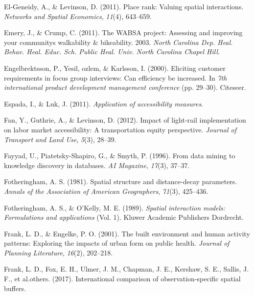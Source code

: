 \documentclass[12pt,twoside]{reedthesis}
\newlength{\cslhangindent}
\newenvironment{CSLReferences}[2] %
 {%
  \setlength{\parindent}{0pt}
  \ifodd #1 \everypar{\setlength{\hangindent}{\cslhangindent}}\ignorespaces\fi
  \ifnum #2 > 0
  \setlength{\parskip}{#2\baselineskip}
  \fi
 }%
 {}
\begin{document}
\begin{CSLReferences}{1}{0}
\leavevmode{}%
El-Geneidy, A., \& Levinson, D. (2011). Place rank: Valuing spatial interactions. \emph{Networks and Spatial Economics}, \emph{11}(4), 643--659.

\leavevmode{}%
Emery, J., \& Crump, C. (2011). The WABSA project: Assessing and improving your communitys walkability \& bikeability. 2003. \emph{North Carolina Dep. Heal. Behav. Heal. Educ. Sch. Public Heal. Univ. North Carolina Chapel Hill}.

\leavevmode{}%
Engelbrektsson, P., Yesil, ozlem, \& Karlsson, I. (2000). Eliciting customer requirements in focus group interviews: Can efficiency be increased. In \emph{7th international product development management conference} (pp. 29--30). Citeseer.

\leavevmode{}%
Espada, I., \& Luk, J. (2011). \emph{Application of accessibility measures}.

\leavevmode{}%
Fan, Y., Guthrie, A., \& Levinson, D. (2012). Impact of light-rail implementation on labor market accessibility: A transportation equity perspective. \emph{Journal of Transport and Land Use}, \emph{5}(3), 28--39.

\leavevmode{}%
Fayyad, U., Piatetsky-Shapiro, G., \& Smyth, P. (1996). From data mining to knowledge discovery in databases. \emph{AI Magazine}, \emph{17}(3), 37--37.

\leavevmode{}%
Fotheringham, A. S. (1981). Spatial structure and distance-decay parameters. \emph{Annals of the Association of American Geographers}, \emph{71}(3), 425--436.

\leavevmode{}%
Fotheringham, A. S., \& O'Kelly, M. E. (1989). \emph{Spatial interaction models: Formulations and applications} (Vol. 1). Kluwer Academic Publishers Dordrecht.

\leavevmode{}%
Frank, L. D., \& Engelke, P. O. (2001). The built environment and human activity patterns: Exploring the impacts of urban form on public health. \emph{Journal of Planning Literature}, \emph{16}(2), 202--218.

\leavevmode{}%
Frank, L. D., Fox, E. H., Ulmer, J. M., Chapman, J. E., Kershaw, S. E., Sallis, J. F., et al.others. (2017). International comparison of observation-specific spatial buffers.


\end{CSLReferences}
\end{document}
